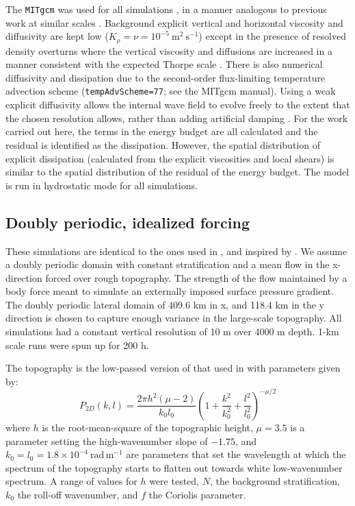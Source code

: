 \documentclass[twocol]{ametsocV5}
\begin{document}
The \verb+MITgcm+ was used for all simulations \citep{marshalletal97}, in a manner analogous to previous work at similar scales \citep{buijsmanetal14,klymaketal16b, klymak18}.  Background explicit vertical and horizontal viscosity and diffusivity are kept low ($K_{\rho} = \nu = 10^{-5}\ \mathrm{m^2\ s^{-1}}$) except in the presence of resolved density overturns where the vertical viscosity and diffusions are increased in a manner consistent with the expected Thorpe scale \citep{klymaklegg10}.  There is also numerical diffusivity and dissipation due to the second-order flux-limiting temperature advection scheme (\verb+tempAdvScheme=77+; see the MITgcm manual).  Using a weak explicit diffusivity allows the internal wave field to evolve freely to the extent that the chosen resolution allows, rather than adding artificial damping \citep{ShakespeareHogg17}.  For the work carried out here, the terms in the energy budget are all calculated and the residual is identified as the dissipation.  However, the spatial distribution of explicit dissipation (calculated from the explicit viscosities and local shears) is similar to the spatial distribution of the residual of the energy budget.  The model is run in hydrostatic mode for all simulations.  

\subsection{Doubly periodic, idealized forcing}

These simulations are identical to the ones used in \citet{klymak18}, and inspired by \citet{nikurashinferrari14}.  We assume a doubly periodic domain with constant stratification and a mean flow in the x-direction forced over rough topography.  The strength of the flow maintained by a body force meant to simulate an externally imposed surface pressure gradient.  The doubly periodic lateral domain of 409.6 km in x, and 118.4 km in the y direction is chosen to capture enough variance in the large-scale topography. All simulations had a constant vertical resolution of 10 m over 4000 m depth.  1-km scale runs were spun up for 200 h.

The topography is the low-passed version of that used in \cite{klymak18} with parameters given by: 
\begin{equation}
    P_{2D}(k,l) = \frac{2\pi h^2 \left(\mu-2 \right)}{k_0l_0}\left( 1 + \frac{k^2}{k_0^2} + \frac{l^2}{l_0^2}\right)^{-\mu/2}
    \label{eq:topo2d}
\end{equation}
where $h$ is the root-mean-square of the topographic height, $\mu=3.5$ is a parameter setting the high-wavenumber slope of $-1.75$, and $k_0=l_0 = 1.8\times10^{-4}\ \mathrm{rad\,m^{-1}}$ are parameters that set the wavelength at which the spectrum of the topography starts to flatten out towards white low-wavenumber spectrum.  A range of values for $h$ were tested, $N$, the background stratification, $k_0$ the roll-off wavenumber, and $f$ the Coriolis parameter.  
\end{document}
